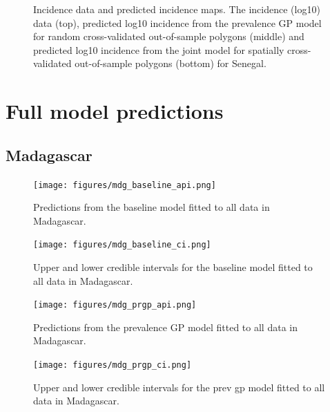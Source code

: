 \documentclass[10pt,a4]{article}
\begin{document}
\begin{figure}[h!]
\caption{\label{predobsmapsen3}
Incidence data and predicted incidence maps.
The incidence (log10) data (top), predicted log10 incidence from the prevalence GP model for random cross-validated out-of-sample polygons (middle) and predicted log10 incidence from the joint model for spatially cross-validated out-of-sample polygons (bottom) for Senegal.
}
\end{figure}



\clearpage
\section{Full model predictions}
\subsection{Madagascar}

\begin{figure}[h!]
\centering

\texttt{[image: figures/mdg\_baseline\_api.png]}

\caption{Predictions from the baseline model fitted to all data in Madagascar.}
\label{baselinemdg}
\end{figure}



\begin{figure}[h!]
\centering

\texttt{[image: figures/mdg\_baseline\_ci.png]}

\caption{Upper and lower credible intervals for the baseline model fitted to all data in Madagascar.}
\label{basemdgci}
\end{figure}



\begin{figure}[h!]
\centering

\texttt{[image: figures/mdg\_prgp\_api.png]}

\caption{Predictions from the prevalence GP model fitted to all data in Madagascar.}
\label{gpmdg}
\end{figure}



\begin{figure}[h!]
\centering

\texttt{[image: figures/mdg\_prgp\_ci.png]}

\caption{Upper and lower credible intervals for the prev gp model fitted to all data in Madagascar.}
\label{prgpmdgci}
\end{figure}
\end{document}
